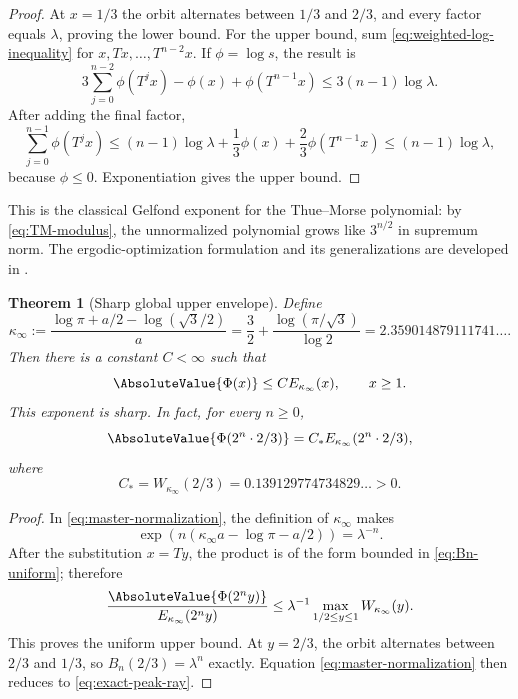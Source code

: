 \documentclass[11pt,oneside]{article}
\newtheorem{theorem}{Theorem}[section]
\theoremstyle{definition}
\theoremstyle{remark}
\newcommand{\Phiup}{\Phi}
\begin{document}
\begin{proof}
At $x=1/3$ the orbit alternates between $1/3$ and $2/3$, and every factor equals
$\lambda$, proving the lower bound.  For the upper bound, sum
\eqref{eq:weighted-log-inequality} for $x,Tx,\dots,T^{n-2}x$.  If
$\phi=\log s$, the result is
\[
 3\sum_{j=0}^{n-2}\phi(T^jx)-\phi(x)+\phi(T^{n-1}x)
 \le3(n-1)\log\lambda.
\]
After adding the final factor,
\[
 \sum_{j=0}^{n-1}\phi(T^jx)
 \le(n-1)\log\lambda+\frac13\phi(x)+\frac23\phi(T^{n-1}x)
 \le(n-1)\log\lambda,
\]
because $\phi\le0$.  Exponentiation gives the upper bound.
\end{proof}

This is the classical Gelfond exponent for the Thue--Morse polynomial: by
\eqref{eq:TM-modulus}, the unnormalized polynomial grows like $3^{n/2}$ in supremum norm.
The ergodic-optimization formulation and its generalizations are developed in
\cite{fan-schmeling-shen}.

\begin{theorem}[Sharp global upper envelope]
\label{thm:uniform-envelope}
Define
\begin{equation}
 \boxed{\displaystyle
 \kappa_\infty
 :=\frac{\log\pi+a/2-\log(\sqrt3/2)}{a}
 =\frac32+\frac{\log(\pi/\sqrt3)}{\log2}
 =2.359014879111741\ldots .}
 \label{eq:kappa-infty}
\end{equation}
Then there is a constant $C<\infty$ such that
\begin{equation}
 \AbsoluteValue{\Phiup(x)}\le C E_{\kappa_\infty}(x),
 \qquad x\ge1.
 \label{eq:uniform-envelope}
\end{equation}
This exponent is sharp.  In fact, for every $n\ge0$,
\begin{equation}
 \AbsoluteValue{\Phiup(2^n\cdot2/3)}
 =C_*E_{\kappa_\infty}(2^n\cdot2/3),
 \label{eq:exact-peak-ray}
\end{equation}
where
\begin{equation}
 C_*=W_{\kappa_\infty}(2/3)
 =0.139129774734829\ldots>0.
 \label{eq:Cstar}
\end{equation}
\end{theorem}

\begin{proof}
In \eqref{eq:master-normalization}, the definition of $\kappa_\infty$ makes
\[
 \exp(n(\kappa_\infty a-\log\pi-a/2))=\lambda^{-n}.
\]
After the substitution $x=Ty$, the product is of the form bounded in
\eqref{eq:Bn-uniform}; therefore
\[
 \frac{\AbsoluteValue{\Phiup(2^ny)}}{E_{\kappa_\infty}(2^ny)}
 \le\lambda^{-1}\max_{1/2\le y\le1}W_{\kappa_\infty}(y).
\]
This proves the uniform upper bound.  At $y=2/3$, the orbit alternates between $2/3$ and
$1/3$, so $B_n(2/3)=\lambda^n$ exactly.  Equation
\eqref{eq:master-normalization} then reduces to \eqref{eq:exact-peak-ray}.
\end{proof}
\end{document}
